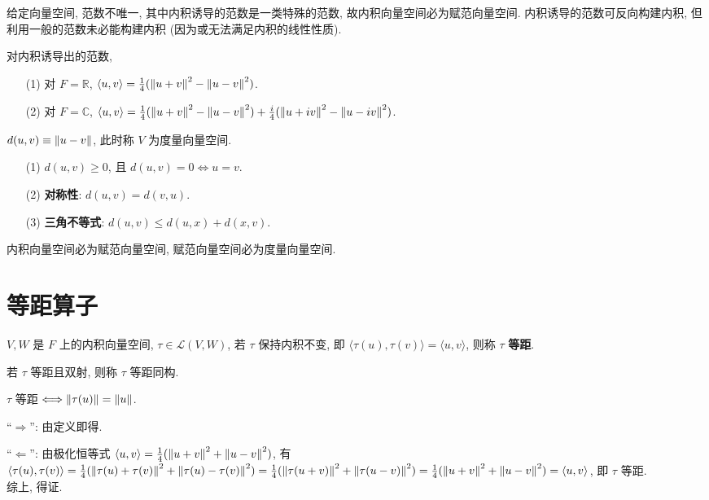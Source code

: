\documentclass{note}
\begin{document}
给定向量空间, 范数不唯一, 其中内积诱导的范数是一类特殊的范数, 故内积向量空间必为赋范向量空间. 内积诱导的范数可反向构建内积, 但利用一般的范数未必能构建内积 (因为或无法满足内积的线性性质).

\begin{thm}
    对内积诱导出的范数,
    \begin{itemize}
        \item[(1)] 对 $F=\mathbb{R}$, $\langle u,v\rangle=\frac{1}{4}(\left\lVert u+v\right\rVert^2-\left\lVert u-v\right\rVert^2)$.
        \item[(2)] 对 $F=\mathbb{C}$, $\langle u,v\rangle=\frac{1}{4}(\left\lVert u+v\right\rVert^2-\left\lVert u-v\right\rVert^2)+\frac{i}{4}(\left\lVert u+iv\right\rVert^2-\left\lVert u-iv\right\rVert^2)$.
    \end{itemize}
\end{thm}

\begin{df}[度量/距离]
    $d(u,v)\equiv\left\lVert u-v\right\rVert$, 此时称 $V$ 为度量向量空间.
\end{df}

\begin{thm}
    \begin{itemize}
        \item[(1)] $d(u,v)\geq 0$, 且 $d(u,v)=0\Longleftrightarrow u=v$.
        \item[(2)] \textbf{对称性}: $d(u,v)=d(v,u)$.
        \item[(3)] \textbf{三角不等式}: $d(u,v)\leq d(u,x)+d(x,v)$.
    \end{itemize}
\end{thm}

内积向量空间必为赋范向量空间, 赋范向量空间必为度量向量空间.

\section{等距算子}
\begin{df}[等距]
    $V,W$ 是 $F$ 上的内积向量空间, $\tau\in\mathcal{L}(V,W)$, 若 $\tau$ 保持内积不变, 即 $\langle\tau(u),\tau(v)\rangle=\langle u,v\rangle$, 则称 $\tau$ \textbf{等距}.
\end{df}

\begin{df}[等距同构]
    若 $\tau$ 等距且双射, 则称 $\tau$ 等距同构.
\end{df}

\begin{thm}[(课本定理 9.5)]
    $\tau$ 等距 $\Longleftrightarrow\left\lVert\tau(u)\right\rVert=\left\lVert u\right\rVert$.
\end{thm}
\begin{pf}
    ``$\Longrightarrow$'': 由定义即得.

    ``$\Longleftarrow$'': 由极化恒等式 $\langle u,v\rangle=\frac{1}{4}(\left\lVert u+v\right\rVert^2+\left\lVert u-v\right\rVert^2)$, 有 $\langle\tau(u),\tau(v)\rangle=\frac{1}{4}(\left\lVert\tau(u)+\tau(v)\right\rVert^2+\left\lVert\tau(u)-\tau(v)\right\rVert^2)=\frac{1}{4}(\left\lVert\tau(u+v)\right\rVert^2+\left\lVert\tau(u-v)\right\rVert^2)=\frac{1}{4}(\left\lVert u+v\right\rVert^2+\left\lVert u-v\right\rVert^2)=\langle u,v\rangle$, 即 $\tau$ 等距.\\

    综上, 得证.
\end{pf}
\end{document}
